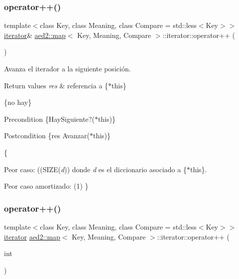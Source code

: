 \subsubsection{\texorpdfstring{operator++()}{operator++()}\hspace{0.1cm}{\footnotesize\ttfamily [1/2]}}
{\footnotesize\ttfamily template$<$class Key, class Meaning, class Compare = std\+::less$<$\+Key$>$$>$ \\
\hyperlink{classaed2_1_1map_1_1iterator}{iterator}\& \hyperlink{classaed2_1_1map}{aed2\+::map}$<$ Key, Meaning, Compare $>$\+::iterator\+::operator++ (\begin{DoxyParamCaption}{ }\end{DoxyParamCaption})\hspace{0.3cm}{\ttfamily [inline]}}



Avanza el iterador a la siguiente posición. 


\begin{DoxyRetVals}{Return values}
{\em res} & referencia a \{$\ast$this\}\\
\hline
\end{DoxyRetVals}
\{no hay\}

\begin{DoxyPrecond}{Precondition}
\{Hay\+Siguiente?($\ast$this)\} 
\end{DoxyPrecond}
\begin{DoxyPostcond}{Postcondition}
\{res  Avanzar($\ast$this)\}
\end{DoxyPostcond}
\{
\begin{DoxyItemize}
\item Peor caso\+: ((S\+I\+ZE({\itshape d})) donde {\itshape d} es el diccionario asociado a \{$\ast$this\}.
\item Peor caso amortizado\+: (1) \} 
\end{DoxyItemize}\mbox{\label{classaed2_1_1map_1_1iterator_af4fe5565eb478cfccd254b2ef230b974}} 
\subsubsection{\texorpdfstring{operator++()}{operator++()}\hspace{0.1cm}{\footnotesize\ttfamily [2/2]}}
{\footnotesize\ttfamily template$<$class Key, class Meaning, class Compare = std\+::less$<$\+Key$>$$>$ \\
\hyperlink{classaed2_1_1map_1_1iterator}{iterator} \hyperlink{classaed2_1_1map}{aed2\+::map}$<$ Key, Meaning, Compare $>$\+::iterator\+::operator++ (\begin{DoxyParamCaption}\item[{int}]{ }\end{DoxyParamCaption})\hspace{0.3cm}{\ttfamily [inline]}}



